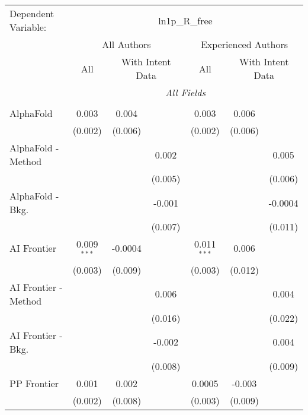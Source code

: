 \begingroup
\centering
\begin{tabular}{lcccccc}
   \tabularnewline \midrule \midrule
   Dependent Variable: & \multicolumn{6}{c}{ln1p\_R\_free}\\
 & \multicolumn{3}{c}{All Authors} & \multicolumn{3}{c}{Experienced Authors} \\
\cmidrule(lr){2-4} \cmidrule(lr){5-7}
 & \multicolumn{1}{c}{All} & \multicolumn{2}{c}{With Intent Data} & \multicolumn{1}{c}{All} & \multicolumn{2}{c}{With Intent Data} \\
\cmidrule(lr){2-2} \cmidrule(lr){3-4} \cmidrule(lr){5-5} \cmidrule(lr){6-7}
 & \multicolumn{6}{c}{\textit{All Fields}} \\ \\
   AlphaFold            & 0.003         & 0.004   &         & 0.003         & 0.006   &   \\   
                        & (0.002)       & (0.006) &         & (0.002)       & (0.006) &   \\   
   AlphaFold - Method   &               &         & 0.002   &               &         & 0.005\\   
                        &               &         & (0.005) &               &         & (0.006)\\   
   AlphaFold - Bkg.     &               &         & -0.001  &               &         & -0.0004\\   
                        &               &         & (0.007) &               &         & (0.011)\\   
   AI Frontier          & 0.009$^{***}$ & -0.0004 &         & 0.011$^{***}$ & 0.006   &   \\   
                        & (0.003)       & (0.009) &         & (0.003)       & (0.012) &   \\   
   AI Frontier - Method &               &         & 0.006   &               &         & 0.004\\   
                        &               &         & (0.016) &               &         & (0.022)\\   
   AI Frontier - Bkg.   &               &         & -0.002  &               &         & 0.004\\   
                        &               &         & (0.008) &               &         & (0.009)\\   
   PP Frontier          & 0.001         & 0.002   &         & 0.0005        & -0.003  &   \\   
                        & (0.002)       & (0.008) &         & (0.003)       & (0.009) &   \\   

\end{tabular}
